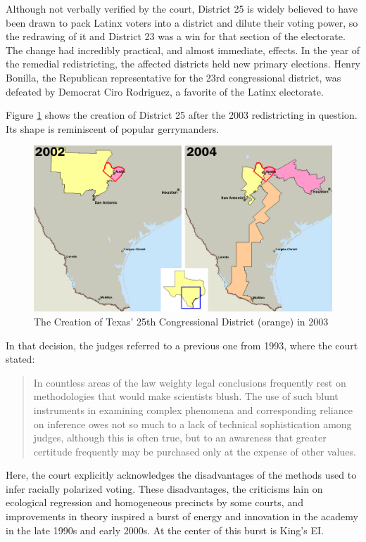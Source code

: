 Although not verbally verified by the court, District 25 is widely believed to have been drawn to pack Latinx voters into a district and dilute their voting power, so the redrawing of it and District 23 was a win for that section of the electorate. The change had incredibly practical, and almost immediate, effects. In the year of the remedial redistricting, the affected districts held new primary elections. Henry Bonilla, the Republican representative for the 23rd congressional district, was defeated by Democrat Ciro Rodriguez, a favorite of the Latinx electorate.

Figure \ref{fig:district25} shows the creation of District 25 after the 2003 redistricting in question. Its shape is reminiscent of popular gerrymanders.

\begin{figure}[ht]\centering
 \includegraphics[width=.75\linewidth]{figures/district25.png}
 \caption{The Creation of Texas' 25th Congressional District (orange) in 2003\cite{district25}}
 \label{fig:district25}
\end{figure}

In that decision, the judges referred to a previous one from 1993, where the court stated:

\begin{quote}
 In countless areas of the law weighty legal conclusions frequently rest on methodologies that would make scientists blush. The use of such blunt instruments in examining complex phenomena and corresponding reliance on inference owes not so much to a lack of technical sophistication among judges, although this is often true, but to an awareness that greater certitude frequently may be purchased only at the expense of other values.\cite{clements}
\end{quote}

Here, the court explicitly acknowledges the disadvantages of the methods used to infer racially polarized voting. These disadvantages, the criticisms lain on ecological regression and homogeneous precincts by some courts, and improvements in theory inspired a burst of energy and innovation in the academy in the late 1990s and early 2000s. At the center of this burst is King's EI.


